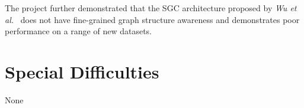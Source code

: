 \documentclass[12pt,a4paper,openany,openright]{report}
\begin{document}
The project further demonstrated that the SGC architecture proposed by \textit{Wu et al.}~\cite{wu2019simplifying} does not have fine-grained graph structure awareness and demonstrates poor performance on a range of new datasets.

\section*{Special Difficulties}

None


\pagestyle{headings}

\tableofcontents
\clearpage
{}









\appendix







\end{document}
